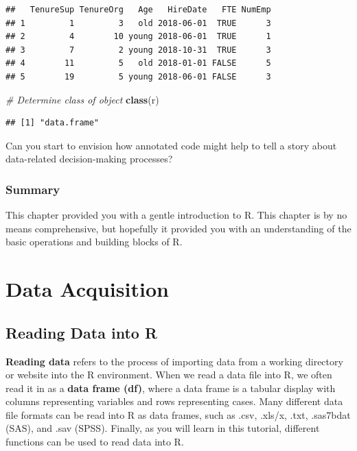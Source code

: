 \documentclass[]{book}
\newenvironment{Shaded}{\begin{snugshade}}{\end{snugshade}}
\newcommand{\KeywordTok}[1]{\textcolor[rgb]{0.13,0.29,0.53}{\textbf{#1}}}
\newcommand{\CommentTok}[1]{\textcolor[rgb]{0.56,0.35,0.01}{\textit{#1}}}
\newcommand{\NormalTok}[1]{#1}
\begin{document}
\begin{verbatim}
##   TenureSup TenureOrg   Age   HireDate   FTE NumEmp
## 1         1         3   old 2018-06-01  TRUE      3
## 2         4        10 young 2018-06-01  TRUE      1
## 3         7         2 young 2018-10-31  TRUE      3
## 4        11         5   old 2018-01-01 FALSE      5
## 5        19         5 young 2018-06-01 FALSE      3
\end{verbatim}

\begin{Shaded}
\begin{Highlighting}[]
\CommentTok{# Determine class of object}
\KeywordTok{class}\NormalTok{(r)}
\end{Highlighting}
\end{Shaded}

\begin{verbatim}
## [1] "data.frame"
\end{verbatim}

Can you start to envision how annotated code might help to tell a story
about data-related decision-making processes?

\section{Summary}\label{summary}

This chapter provided you with a gentle introduction to R. This chapter
is by no means comprehensive, but hopefully it provided you with an
understanding of the basic operations and building blocks of R.

\part{Data Acquisition}\label{part-data-acquisition}

\hypertarget{read}{\chapter{Reading Data into R}\label{read}}

\textbf{Reading data} refers to the process of importing data from a
working directory or website into the R environment. When we read a data
file into R, we often read it in as a \textbf{data frame (df)}, where a
data frame is a tabular display with columns representing variables and
rows representing cases. Many different data file formats can be read
into R as data frames, such as .csv, .xls/x, .txt, .sas7bdat (SAS), and
.sav (SPSS). Finally, as you will learn in this tutorial, different
functions can be used to read data into R.
\end{document}
